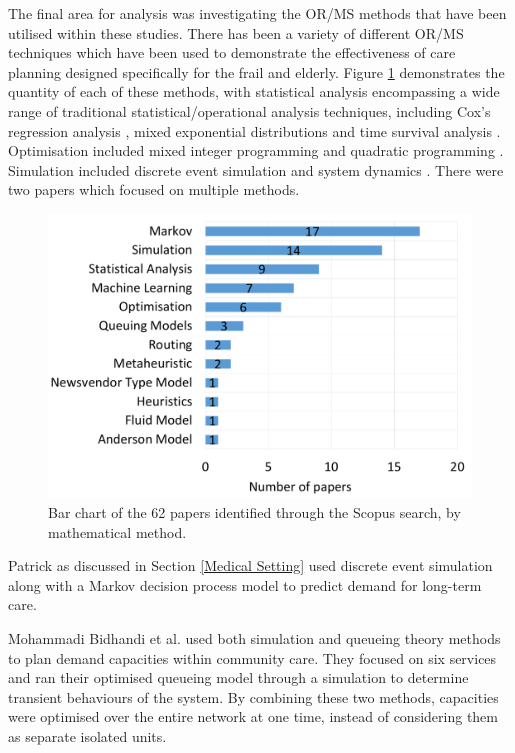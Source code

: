\documentclass[../thesis.tex]{subfiles}
\begin{document}
The final area for analysis was investigating the OR/MS methods that have been utilised within these studies. There has been a variety of different OR/MS techniques which have been used to demonstrate the effectiveness of care planning designed specifically for the frail and elderly. Figure \ref{fig:Mathematical} demonstrates the quantity of each of these methods, with statistical analysis encompassing a wide range of traditional statistical/operational analysis techniques, including Cox's regression analysis \cite{Heggestad}, mixed exponential distributions \cite{Harrison} and time survival analysis \cite{Muramatsu}. Optimisation included mixed integer programming \cite{Davari} and quadratic programming \cite{Tao}. Simulation included discrete event simulation \cite{Zhang1} and system dynamics \cite{Cepoiu}. There were two papers which focused on multiple methods.

\begin{figure}[H]
\centering
    \includegraphics[scale = 0.45]{Chapter2/Figures/ModelsGraph.pdf}
    \caption{Bar chart of the 62 papers identified through the Scopus search, by mathematical method.}
    \label{fig:Mathematical}
\end{figure}

Patrick \cite{Patrick} as discussed in Section \ref{Medical Setting} used discrete event simulation along with a Markov decision process model to predict demand for long-term care. 

Mohammadi Bidhandi et al. \cite{Bidhandi} used both simulation and queueing theory methods to plan demand capacities within community care. They focused on six services and ran their optimised queueing model through a simulation to determine transient behaviours of the system. By combining these two methods, capacities were optimised over the entire network at one time, instead of considering them as separate isolated units.
\end{document}
